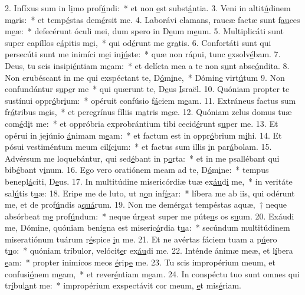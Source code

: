 2. Infíxus sum in l\uline{i}mo prof\uline{ú}ndi:~* et non \uline{e}st subst\uline{á}ntia.
3. Veni in altit\uline{ú}dinem m\uline{a}ris:~* et temp\uline{é}stas dem\uline{é}rsit me.
4. Laborávi clamans, raucæ factæ sunt f\uline{au}ces m\uline{e}æ:~* defecérunt óculi mei, dum spero in D\uline{e}um m\uline{e}um.
5. Multiplicáti sunt super capíllos c\uline{á}pitis m\uline{e}i,~* qui od\uline{é}runt me gr\uline{a}tis.
6. Confortáti sunt qui persecúti sunt me inimíci m\uline{e}i inj\uline{ú}ste:~* quæ non rápui, tunc \uline{e}xsolv\uline{é}bam.
7. Deus, tu scis insipi\uline{é}ntiam m\uline{e}am:~* et delícta mea a te non s\uline{u}nt absc\uline{ó}ndita.
8. Non erubéscant in me qui exspéctant te, D\uline{ó}m\uline{i}ne,~* Dómin\uline{e} virt\uline{ú}tum
9. Non confundántur s\uline{u}p\uline{e}r me~* qui quærunt te, D\uline{e}us \uline{I}sraël.
10. Quóniam propter te sustínui oppr\uline{ó}br\uline{i}um:~* opéruit confúsio f\uline{á}ciem m\uline{e}am.
11. Extráneus factus sum fr\uline{á}tribus m\uline{e}is,~* et peregrínus fíliis m\uline{a}tris m\uline{e}æ.
12. Quóniam zelus domus tuæ com\uline{é}d\uline{i}t me:~* et oppróbria exprobrántium tibi cecid\uline{é}runt s\uline{u}per me.
13. Et opérui in jejúnio \uline{á}nimam m\uline{e}am:~* et factum est in oppr\uline{ó}brium m\uline{i}hi.
14. Et pósui vestiméntum meum cil\uline{í}c\uline{i}um:~* et factus sum illis \uline{i}n par\uline{á}bolam.
15. Advérsum me loquebántur, qui sed\uline{é}bant in p\uline{o}rta:~* et in me psallébant qui bib\uline{é}bant v\uline{i}num.
16. Ego vero oratiónem meam ad te, D\uline{ó}m\uline{i}ne:~* tempus benepl\uline{á}citi, D\uline{e}us.
17. In multitúdine misericórdiæ tuæ ex\uline{áu}d\uline{i} me,~* in veritáte sal\uline{ú}tis t\uline{u}æ:
18. Eripe me de luto, ut n\uline{o}n inf\uline{í}gar:~* líbera me ab iis, qui odérunt me, et de prof\uline{ú}ndis a\uline{quá}rum.
19. Non me demérgat tempéstas aquæ,~† neque absórbeat m\uline{e} prof\uline{ú}ndum:~* neque úrgeat super me púte\uline{u}s os s\uline{u}um.
20. Exáudi me, Dómine, quóniam benígna est miseric\uline{ó}rdia t\uline{u}a:~* secúndum multitúdinem miseratiónum tuárum r\uline{é}spice \uline{i}n me.
21. Et ne avértas fáciem tuam a p\uline{ú}ero t\uline{u}o:~* quóniam tríbulor, velócit\uline{e}r ex\uline{áu}di me.
22. Inténde ánimæ meæ, et l\uline{í}bera \uline{e}am:~* propter inimícos meos \uline{é}rip\uline{e} me.
23. Tu scis impropérium meum, et confusi\uline{ó}nem m\uline{e}am,~* et rever\uline{é}ntiam m\uline{e}am.
24. In conspéctu tuo sunt omnes qui tr\uline{í}bul\uline{a}nt me:~* impropérium exspectávit cor meum, \uline{e}t mis\uline{é}riam.
